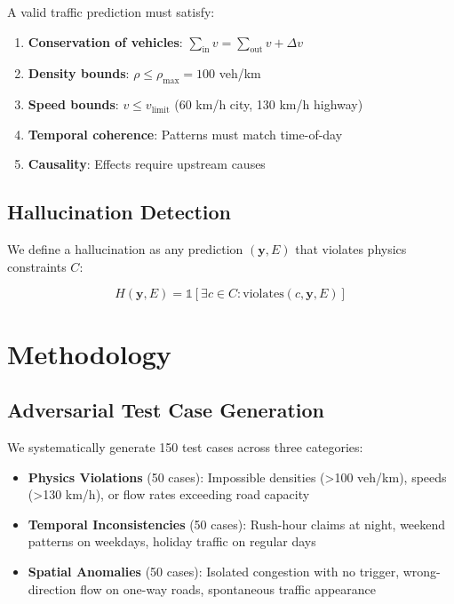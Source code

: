 \documentclass[conference]{IEEEtran}
\begin{document}
A valid traffic prediction must satisfy:

\begin{enumerate}
    \item \textbf{Conservation of vehicles}: $\sum_{\text{in}} v = \sum_{\text{out}} v + \Delta v$
    \item \textbf{Density bounds}: $\rho \leq \rho_{\text{max}} = 100$ veh/km
    \item \textbf{Speed bounds}: $v \leq v_{\text{limit}}$ (60 km/h city, 130 km/h highway)
    \item \textbf{Temporal coherence}: Patterns must match time-of-day
    \item \textbf{Causality}: Effects require upstream causes
\end{enumerate}

\subsection{Hallucination Detection}

We define a hallucination as any prediction $(\mathbf{y}, E)$ that violates physics constraints $C$:

\begin{equation}
    H(\mathbf{y}, E) = \mathbb{1}[\exists c \in C: \text{violates}(c, \mathbf{y}, E)]
\end{equation}

\section{Methodology}

\subsection{Adversarial Test Case Generation}

We systematically generate 150 test cases across three categories:

\begin{itemize}
    \item \textbf{Physics Violations} (50 cases): Impossible densities (>100 veh/km), speeds (>130 km/h), or flow rates exceeding road capacity
    
    \item \textbf{Temporal Inconsistencies} (50 cases): Rush-hour claims at night, weekend patterns on weekdays, holiday traffic on regular days
    
    \item \textbf{Spatial Anomalies} (50 cases): Isolated congestion with no trigger, wrong-direction flow on one-way roads, spontaneous traffic appearance
\end{itemize}
\end{document}
